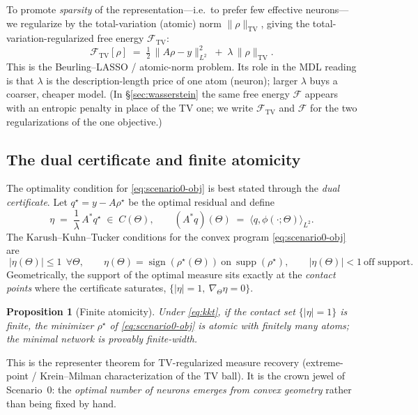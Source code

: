 \documentclass[11pt]{article}
\newtheorem{proposition}{Proposition}
\theoremstyle{definition}
\newcommand{\F}{\mathcal{F}}
\newcommand{\TV}{\mathrm{TV}}
\newcommand{\sign}{\operatorname{sign}}
\newcommand{\supp}{\operatorname{supp}}
\newcommand{\rhostar}{\rho^{\star}}
\newcommand{\half}{\tfrac{1}{2}}
\begin{document}
To promote \emph{sparsity} of the representation---i.e.\ to prefer few effective
neurons---we regularize by the total-variation (atomic) norm $\|\rho\|_{\TV}$, giving the
total-variation-regularized free energy $\F_{\TV}$:
\begin{equation}
\boxed{\;\F_{\TV}[\rho] \;=\; \half\,\|A\rho-y\|_{L^2}^2 \;+\; \lambda\,\|\rho\|_{\TV}.\;}
\label{eq:scenario0-obj}
\end{equation}
This is the Beurling--LASSO / atomic-norm problem. Its role in the MDL reading is that
$\lambda$ is the description-length price of one atom (neuron); larger $\lambda$ buys a
coarser, cheaper model. (In \S\ref{sec:wasserstein} the same free energy $\F$ appears with
an entropic penalty in place of the TV one; we write $\F_{\TV}$ and $\F$ for the two
regularizations of the one objective.)

\subsection{The dual certificate and finite atomicity}
\label{sec:certificate}

The optimality condition for \eqref{eq:scenario0-obj} is best stated through the
\emph{dual certificate}. Let $q^\star = y - A\rhostar$ be the optimal residual and define
\begin{equation}
\eta \;=\; \frac{1}{\lambda}\,A^\ast q^\star \;\in\; C(\Theta),
\qquad
(A^\ast q)(\Theta) \;=\; \langle q,\phi(\cdot;\Theta)\rangle_{L^2}.
\label{eq:eta}
\end{equation}
The Karush--Kuhn--Tucker conditions for the convex program \eqref{eq:scenario0-obj} are
\begin{equation}
\boxed{\;
|\eta(\Theta)|\le 1\ \ \forall\Theta,
\qquad
\eta(\Theta)=\sign(\rhostar(\Theta))\ \text{on}\ \supp(\rhostar),
\qquad
|\eta(\Theta)|<1\ \text{off support}.
\;}
\label{eq:kkt}
\end{equation}
Geometrically, the support of the optimal measure sits exactly at the \emph{contact
points} where the certificate saturates, $\{|\eta|=1,\ \nabla_\Theta\eta=0\}$.

\begin{proposition}[Finite atomicity]
\label{prop:atoms}
Under \eqref{eq:kkt}, if the contact set $\{|\eta|=1\}$ is finite, the minimizer
$\rhostar$ of \eqref{eq:scenario0-obj} is atomic with finitely many atoms; the minimal
network is provably finite-width.
\end{proposition}

This is the representer theorem for TV-regularized measure recovery (extreme-point /
Krein--Milman characterization of the TV ball). It is the crown jewel of Scenario~0: the
\emph{optimal number of neurons emerges from convex geometry} rather than being fixed by
hand.
\end{document}
